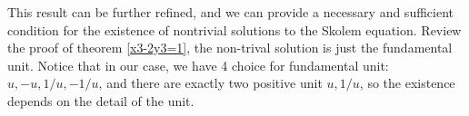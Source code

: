     This result can be further refined, and we can provide a necessary and sufficient condition for the existence of nontrivial solutions to the Skolem equation. Review the proof of theorem \ref{x3-2y3=1}, the non-trival 
    solution is just the fundamental unit. Notice that in our case, we have 4 choice for fundamental unit: \(u,-u,1/u,-1/u\), and there are exactly two positive unit \(u,1/u\), so the existence depends on the detail of the unit.





